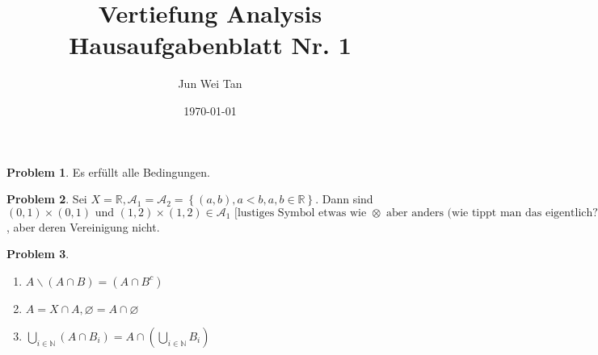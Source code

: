 \documentclass[prb,12pt]{revtex4-2}
\theoremstyle{definition}
\newtheorem{Problem}{Problem}
\theoremstyle{definition}
\newcommand{\N}{\mathbb{N}}
\newcommand{\R}{\mathbb{R}}
\begin{document}
	\title{Vertiefung Analysis Hausaufgabenblatt Nr. 1}
	\author{Jun Wei Tan}
	\date{\today}
	\maketitle
	\begin{Problem}
		Es erfüllt alle Bedingungen.
	\end{Problem}
	\begin{Problem}
		Sei $X=\R, \mathcal{A}_1=\mathcal{A}_2=\left\{ (a,b), a<b,a,b\in\R \right\} $. Dann sind $(0,1)\times (0,1)\text{ und }(1,2)\times (1,2) \in \mathcal{A}_1\text{ [lustiges Symbol etwas wie }\otimes\text{ aber anders (wie tippt man das eigentlich?)]} \mathcal{A_2}$, aber deren Vereinigung nicht.
	\end{Problem}

	\begin{Problem}
		\begin{enumerate}
			\item $A\backslash(A\cap B)=(A\cap B^c)$
			\item  $A=X\cap A, \varnothing = A \cap \varnothing$
			\item  $\bigcup_{i\in \N} (A \cap B_i)=A \cap \left(\bigcup_{i\in \N}B_i\right) $
		\end{enumerate}
	\end{Problem}
	
\end{document}

